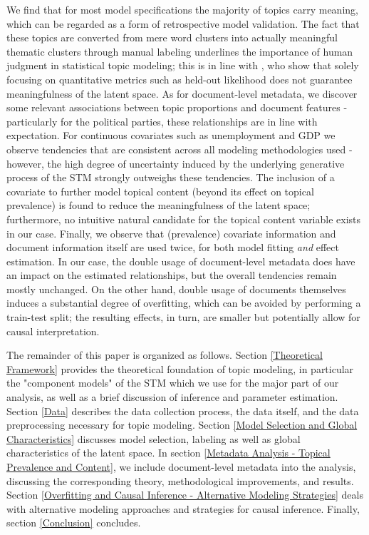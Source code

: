 We find that for most model specifications the majority of topics carry meaning, which can be regarded as a form of retrospective model validation. The fact that these topics are converted from mere word clusters into actually meaningful thematic clusters through manual labeling underlines the importance of human judgment in statistical topic modeling; this is in line with \cite{chang2009reading}, who show that solely focusing on quantitative metrics such as held-out likelihood does not guarantee meaningfulness of the latent space. As for document-level metadata, we discover some relevant associations between topic proportions and document features - particularly for the political parties, these relationships are in line with expectation. For continuous covariates such as unemployment and GDP we observe tendencies that are consistent across all modeling methodologies used - however, the high degree of uncertainty induced by the underlying generative process of the STM strongly outweighs these tendencies. The inclusion of a covariate to further model topical content (beyond its effect on topical prevalence) is found to reduce the meaningfulness of the latent space; furthermore, no intuitive natural candidate for the topical content variable exists in our case. Finally, we observe that (prevalence) covariate information and document information itself are used twice, for both model fitting \textit{and} effect estimation. In our case, the double usage of document-level metadata does have an impact on the estimated relationships, but the overall tendencies remain mostly unchanged. On the other hand, double usage of documents themselves induces a substantial degree of overfitting, which can be avoided by performing a train-test split; the resulting effects, in turn, are smaller but potentially allow for causal interpretation.

The remainder of this paper is organized as follows. Section \ref{Theoretical Framework} provides the theoretical foundation of topic modeling, in particular the "component models" of the STM which we use for the major part of our analysis, as well as a brief discussion of inference and parameter estimation. Section \ref{Data} describes the data collection process, the data itself, and the data preprocessing necessary for topic modeling. Section \ref{Model Selection and Global Characteristics} discusses model selection, labeling as well as global characteristics of the latent space. In section \ref{Metadata Analysis - Topical Prevalence and Content}, we include document-level metadata into the analysis, discussing the corresponding theory, methodological improvements, and results. Section \ref{Overfitting and Causal Inference - Alternative Modeling Strategies} deals with alternative modeling approaches and strategies for causal inference. Finally, section \ref{Conclusion} concludes.